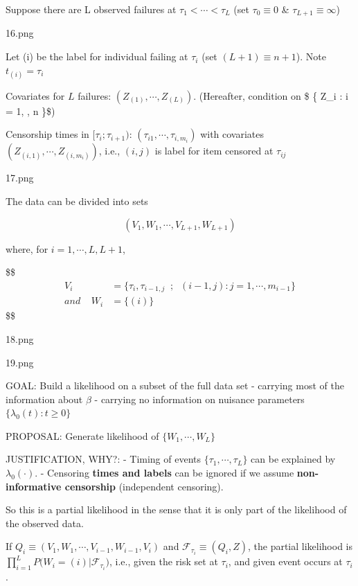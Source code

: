 \documentclass[
]{book}
\begin{document}
{{{Suppose there are L observed failures at \(\tau_1 < \cdots < \tau_L\) (set \(\tau_0 \equiv 0\) \& \(\tau_{L+1} \equiv \infty\))

16.png

Let (i) be the label for individual failing at \(\tau_i\) (set \((L + 1) \equiv n + 1\)). Note \(t_{(i)} = \tau_i\)

Covariates for \(L\) failures: \((Z_{(1)}, \cdots, Z_{(L)})\). (Hereafter, condition on \$ \Big \{ Z\_i : i = 1, \cdots, n \Big \}\$)

Censorship times in \([\tau_i; \tau_{i+1})\): \((\tau_{i1}, \cdots, \tau_{i, m_i})\) with covariates \((Z_{(i,1)}, \cdots, Z_{(i,m_i)})\), i.e., \((i, j)\) is label for item censored at \(\tau_{ij}\)

17.png

The data can be divided into sets

\[
(V_1 , W_1, \cdots, V_{L+1} ,  W_{L+1})
\]

where, for \(i = 1, \cdots, L, L+1\),

\$\$
\begin{align}
V_i &= \Big \{ \tau_i , \tau_{i-1, j}  \; \; ; \; \; (i-1, j):j = 1, \cdots, m_{i-1} \Big \}

\\

and \; \; \; \;W_i &= \Big \{ (i) \Big \}


\end{align}
\$\$

18.png

19.png

GOAL: Build a likelihood on a subset of the full data set
- carrying most of the information about \(\beta\)
- carrying no information on nuisance parameters \(\Big \{ \lambda_0 (t) : t \ge 0 \Big \}\)

PROPOSAL: Generate likelihood of \(\Big \{ W_1, \cdots, W_L \Big \}\)

JUSTIFICATION, WHY?:
- Timing of events \(\Big \{ \tau_1 , \cdots, \tau_L \Big \}\) can be explained by \(\lambda_0(\cdot)\).
- Censoring \textbf{times and labels} can be ignored if we assume \textbf{non-informative censorship} (independent censoring).

So this is a partial likelihood in the sense that it is only part of the likelihood of the observed data.

If \(Q_i \equiv (V_1, W_1 , \cdots, V_{i-1}, W_{i-1}, V_i)\) and \(\mathcal F_{\tau_i} \equiv (Q_i, Z)\), the partial likelihood is \(\prod_{i=1}^L P \Big ( W_i = (i) \Big | \mathcal F_{\tau_i} \Big)\), i.e., given the risk set at \(\tau_i\), and given event occurs at \(\tau_i\).

}}}
\end{document}
